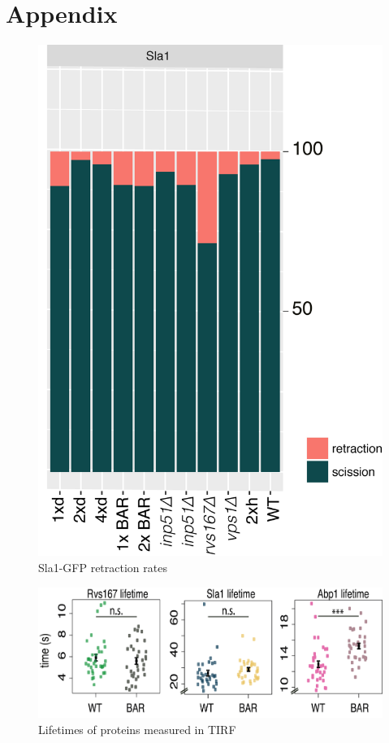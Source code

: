 \chapter{Appendix} %
\label{Ch:Appendix}

\begin{figure}[H]
\includegraphics[scale=1.5]{figures/appendix/retraction_rates_all}
\caption{Sla1-GFP retraction rates}
\end{figure}


\begin{figure}[H]
	\includegraphics[scale=0.6]{figures/appendix/delsh3_5}
	\caption{Lifetimes of proteins measured in TIRF}
\end{figure}